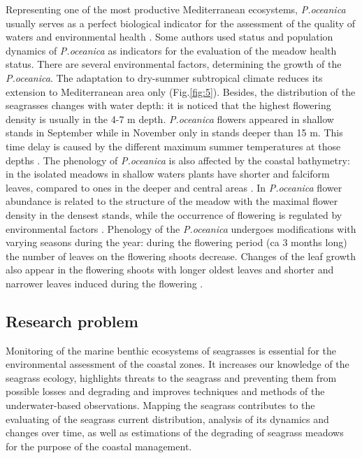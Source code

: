 \documentclass[11pt]{article}
\begin{document}
Representing one of the most productive Mediterranean ecosystems, \textit{P.oceanica} usually serves as a
perfect biological indicator for the assessment of the quality of waters and environmental health
\cite{Boudouresque89}\label{Boudouresque89}. Some authors \cite{Guidetti08,Montefalcone09}\label{Guidetti08} \label{Montefalcone09} used status and population dynamics of \textit{P.oceanica} as indicators for the evaluation of the meadow health status. 
There are several environmental factors, determining the growth of the \textit{P.oceanica}. 
The adaptation
to dry-summer subtropical climate reduces its extension to Mediterranean area only (Fig.\ref{fig:5}).
Besides, the distribution of the seagrasses changes with water depth: it is noticed \cite{Dural10}\label{Dural10} that
the highest flowering density is usually in the 4-7 m depth. 
\textit{P.oceanica} flowers appeared in shallow
stands in September while in November only in stands deeper than 15 m. This time delay is caused by
the different maximum summer temperatures at those depths \cite{Buia91}\label{Buia91}.
The phenology of \textit{P.oceanica} is also affected by the coastal bathymetry: in the isolated meadows in shallow waters plants have shorter and falciform leaves, compared to ones in the deeper and central
areas \cite{Dural10}\label{Dural10}. In \textit{P.oceanica} flower abundance is related to the structure of the meadow with
the maximal flower density in the densest stands, while the occurrence of flowering is regulated by
environmental factors \cite{Buia91}\label{Buia91}. Phenology of the \textit{P.oceanica} undergoes 
modifications with varying seasons during the year: during the flowering period (ca 3 months long)
the number of leaves on the flowering shoots decrease. Changes of the leaf growth also appear in the
flowering shoots with longer oldest leaves and shorter and narrower leaves induced during the
flowering \cite{Gobert01}\label{Gobert01}.

\subsection{Research problem}
Monitoring of the marine benthic ecosystems of seagrasses is essential for the environmental
assessment of the coastal zones. It increases our knowledge of the seagrass ecology, highlights 
threats to the seagrass and preventing them from possible losses and degrading and improves
techniques and methods of the underwater-based observations. Mapping the seagrass contributes to
the evaluating of the seagrass current distribution, analysis of its dynamics and changes over time, as
well as estimations of the degrading of seagrass meadows for the purpose of the coastal management.
\end{document}
